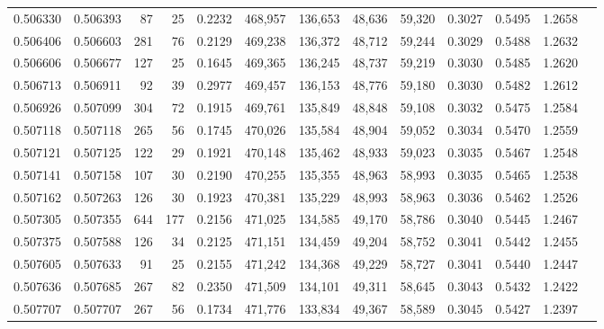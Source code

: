 \begin{tabular}{rrrrrrrrrrrrr}
0.506330 & 0.506393 &    87 &    25 &                                     0.2232 & 468,957 & 136,653 &  48,636 &  59,320 & 0.3027 & 0.5495 & 1.2658 \\
0.506406 & 0.506603 &   281 &    76 &                                     0.2129 & 469,238 & 136,372 &  48,712 &  59,244 & 0.3029 & 0.5488 & 1.2632 \\
0.506606 & 0.506677 &   127 &    25 &                                     0.1645 & 469,365 & 136,245 &  48,737 &  59,219 & 0.3030 & 0.5485 & 1.2620 \\
0.506713 & 0.506911 &    92 &    39 &                                     0.2977 & 469,457 & 136,153 &  48,776 &  59,180 & 0.3030 & 0.5482 & 1.2612 \\
0.506926 & 0.507099 &   304 &    72 &                                     0.1915 & 469,761 & 135,849 &  48,848 &  59,108 & 0.3032 & 0.5475 & 1.2584 \\
0.507118 & 0.507118 &   265 &    56 &                                     0.1745 & 470,026 & 135,584 &  48,904 &  59,052 & 0.3034 & 0.5470 & 1.2559 \\
0.507121 & 0.507125 &   122 &    29 &                                     0.1921 & 470,148 & 135,462 &  48,933 &  59,023 & 0.3035 & 0.5467 & 1.2548 \\
0.507141 & 0.507158 &   107 &    30 &                                     0.2190 & 470,255 & 135,355 &  48,963 &  58,993 & 0.3035 & 0.5465 & 1.2538 \\
0.507162 & 0.507263 &   126 &    30 &                                     0.1923 & 470,381 & 135,229 &  48,993 &  58,963 & 0.3036 & 0.5462 & 1.2526 \\
0.507305 & 0.507355 &   644 &   177 &                                     0.2156 & 471,025 & 134,585 &  49,170 &  58,786 & 0.3040 & 0.5445 & 1.2467 \\
0.507375 & 0.507588 &   126 &    34 &                                     0.2125 & 471,151 & 134,459 &  49,204 &  58,752 & 0.3041 & 0.5442 & 1.2455 \\
0.507605 & 0.507633 &    91 &    25 &                                     0.2155 & 471,242 & 134,368 &  49,229 &  58,727 & 0.3041 & 0.5440 & 1.2447 \\
0.507636 & 0.507685 &   267 &    82 &                                     0.2350 & 471,509 & 134,101 &  49,311 &  58,645 & 0.3043 & 0.5432 & 1.2422 \\
0.507707 & 0.507707 &   267 &    56 &                                     0.1734 & 471,776 & 133,834 &  49,367 &  58,589 & 0.3045 & 0.5427 & 1.2397 \\

\end{tabular}
